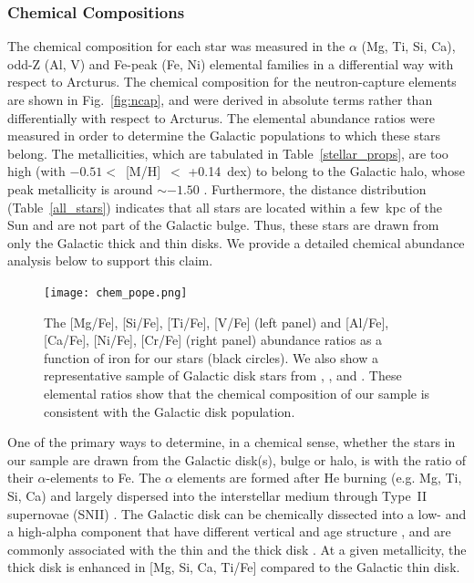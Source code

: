 \documentclass[a4paper,fleqn,usenatbib]{mnras}
\begin{document}
\subsubsection{Chemical Compositions}
\label{chemical}
The chemical composition for each star was measured in the $\alpha$ (Mg, Ti, Si, Ca), odd-Z (Al, V) and Fe-peak (Fe, Ni) elemental families in a differential way with respect to Arcturus. The chemical composition for the neutron-capture elements are shown in Fig.~\ref{fig:ncap}, and were derived in absolute terms rather than differentially with respect to Arcturus. The elemental abundance ratios were measured in order to determine the Galactic populations to which these stars belong. The metallicities, which are tabulated in Table~\ref{stellar_props}, are too high (with $-0.51<$~[M/H]~$<$ +0.14~dex) to belong to the Galactic halo, whose peak metallicity is around $\sim -1.50$ \cite[e.g.][]{Chiba2000}. Furthermore, the distance distribution (Table~\ref{all_stars}) indicates that all stars are located within a few~kpc of the Sun and are not part of the Galactic bulge. Thus, these stars are drawn from only the Galactic thick and thin disks. We provide a detailed chemical abundance analysis below to support this claim.\\

\begin{figure}
\noindent\texttt{[image: chem\_pope.png]}

\caption{\label{alphael}
The [Mg/Fe], [Si/Fe], [Ti/Fe], [V/Fe] (left panel) and [Al/Fe], [Ca/Fe], [Ni/Fe], [Cr/Fe] (right panel) abundance ratios as a function of iron for our stars (black circles). We also show a representative sample of Galactic disk stars from \citet[open red squares]{Bensby2014}, \citet[open orange squares]{Adibekyan2012}, and \citet[light green circles]{Battistini2015}. These elemental ratios show that the chemical composition of our sample is consistent with the Galactic disk population. } %
\end{figure}

One of the primary ways to determine, in a chemical sense, whether the stars in our sample are drawn from the Galactic disk(s), bulge or halo, is with the ratio of their $\alpha$-elements to Fe. The $\alpha$ elements are formed after He burning (e.g. Mg, Ti, Si, Ca) and largely dispersed into the interstellar medium through Type~II supernovae (SNII) \citep{Matteucci2001}. %
The Galactic disk can be chemically dissected into a low- and a high-alpha component that have different vertical and age structure \citep[see e.g.][]{2016ApJ...823...30B,2017A&A...608L...1H,2018MNRAS.475.5487S}, and are commonly associated with the thin and the thick disk \citep[e.g.][and references therein]{Edvardsson1993, Adibekyan2012, Feltzing2013, Bensby2014}. At a given metallicity, the thick disk is enhanced in [Mg, Si, Ca, Ti/Fe] compared to the Galactic thin disk.
\end{document}
